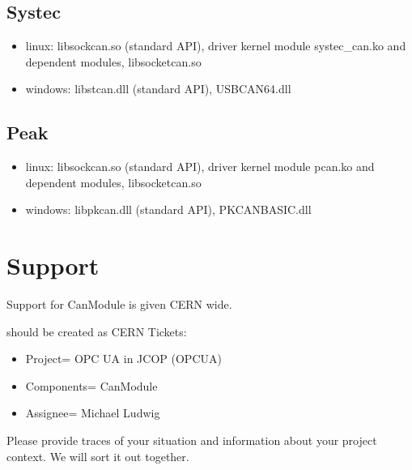 \documentclass[a4paper,10pt,english]{sphinxmanual}
\begin{document}
\section{Systec}
\label{\detokenize{running:systec}}\begin{itemize}
\item {} 
\sphinxAtStartPar
linux: libsockcan.so (standard API), driver kernel module systec\_can.ko and dependent modules, libsocketcan.so

\item {} 
\sphinxAtStartPar
windows: libstcan.dll (standard API), USBCAN64.dll

\end{itemize}


\section{Peak}
\label{\detokenize{running:peak}}\begin{itemize}
\item {} 
\sphinxAtStartPar
linux: libsockcan.so (standard API), driver kernel module pcan.ko and dependent modules, libsocketcan.so

\item {} 
\sphinxAtStartPar
windows: libpkcan.dll (standard API), PKCANBASIC.dll

\end{itemize}


\chapter{Support}
\label{\detokenize{support:support}}\label{\detokenize{support::doc}}
\sphinxAtStartPar
Support for CanModule is given CERN wide.

\sphinxAtStartPar
{} should be created as CERN  Tickets:
\begin{itemize}
\item {} 
\sphinxAtStartPar
Project= OPC UA in JCOP (OPCUA)

\item {} 
\sphinxAtStartPar
Components= CanModule

\item {} 
\sphinxAtStartPar
Assignee= Michael Ludwig

\end{itemize}

\sphinxAtStartPar
Please provide traces of your situation and information about your project context. We will sort it out together.
\end{document}
